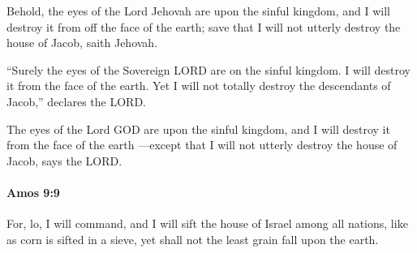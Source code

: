 			\begin{versebox}
					\item[BHS] 
					\item[LXX] 
					\item[ASV] Behold, the eyes of the Lord Jehovah are upon the sinful kingdom, and I will destroy it from off the face of the earth; save that I will not utterly destroy the house of Jacob, saith Jehovah.
					\item[NIV] “Surely the eyes of the Sovereign LORD are on the sinful kingdom. I will destroy it from the face of the earth. Yet I will not totally destroy the descendants of Jacob,” declares the LORD.
					\item[NRSV] The eyes of the Lord GOD are upon the sinful kingdom, and I will destroy it from the face of the earth —except that I will not utterly destroy the house of Jacob, says the LORD.
			\end{versebox}

		\paragraph{Amos 9:9} %
			\label{AMOS-9-9}

			For, lo, I will command, and I will sift the house of Israel among all nations, like as corn is sifted in a sieve, yet shall not the least grain fall upon the earth.

